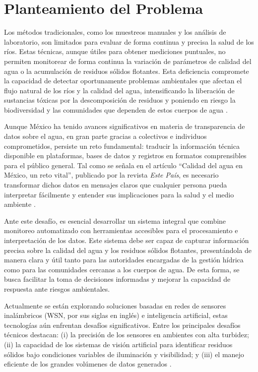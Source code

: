 \section{Planteamiento del Problema}

Los métodos tradicionales, como los muestreos manuales y los análisis de laboratorio, son limitados para evaluar de forma continua y precisa la salud de los ríos. Estas técnicas, aunque útiles para obtener mediciones puntuales, no permiten monitorear de forma continua la variación de parámetros de calidad del agua o la acumulación de residuos sólidos flotantes. Esta deficiencia compromete la capacidad de detectar oportunamente problemas ambientales que afectan el flujo natural de los ríos y la calidad del agua, intensificando la liberación de sustancias tóxicas por la descomposición de residuos y poniendo en riesgo la biodiversidad y las comunidades que dependen de estos cuerpos de agua \cite{monitoreo2023}.

Aunque México ha tenido avances significativos en materia de transparencia de datos sobre el agua, en gran parte gracias a colectivos e individuos comprometidos, persiste un reto fundamental: traducir la información técnica disponible en plataformas, bases de datos y registros en formatos comprensibles para el público general. Tal como se señala en el artículo “Calidad del agua en México, un reto vital”, publicado por la revista \textit{Este País}, es necesario transformar dichos datos en mensajes claros que cualquier persona pueda interpretar fácilmente y entender sus implicaciones para la salud y el medio ambiente \cite{estepais2024}.

Ante este desafío, es esencial desarrollar un sistema integral que combine monitoreo automatizado con herramientas accesibles para el procesamiento e interpretación de los datos. Este sistema debe ser capaz de capturar información precisa sobre la calidad del agua y los residuos sólidos flotantes, presentándola de manera clara y útil tanto para las autoridades encargadas de la gestión hídrica como para las comunidades cercanas a los cuerpos de agua. De esta forma, se busca facilitar la toma de decisiones informadas y mejorar la capacidad de respuesta ante riesgos ambientales\cite{monitoreo2023}.

Actualmente se están explorando soluciones basadas en redes de sensores inalámbricos (WSN, por sus siglas en inglés) e inteligencia artificial, estas tecnologías aún enfrentan desafíos significativos. Entre los principales desafíos técnicos destacan: (i) la precisión de los sensores en ambientes con alta turbidez; (ii) la capacidad de los sistemas de visión artificial para identificar residuos sólidos bajo condiciones variables de iluminación y visibilidad; y (iii) el manejo eficiente de los grandes volúmenes de datos generados \cite{monitoreo2023}.

